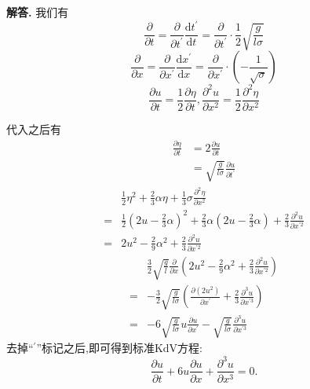 \documentclass[12pt, a4paper, oneside]{ctexart}
\newenvironment{solution}{\par\noindent\textbf{解答. }}{\\\par}
\begin{document}
\begin{solution}
    我们有
    $$
        \frac{\partial }{\partial t}=\frac{\partial }{\partial t^{\prime} }\frac{\mathrm{d}t^{\prime} }{\mathrm{d}t}=\frac{\partial }{\partial t^{\prime} }\cdot\frac{1}{2}\sqrt{\frac{g}{l\sigma}}
    $$
    $$
        \frac{\partial }{\partial x}=\frac{\partial }{\partial x^{\prime} }\frac{\mathrm{d}x^{\prime} }{\mathrm{d}x}=\frac{\partial }{\partial x^{\prime} }\cdot(-\frac{1}{\sqrt{\sigma}})
    $$
    $$
        \frac{\partial u }{\partial t}=\frac{1}{2}\frac{\partial \eta}{\partial t},\frac{\partial ^{2} u}{\partial x^{2} }=\frac{1}{2}\frac{\partial ^{2} \eta}{\partial x^{2} }
    $$

    代入之后有
    \begin{align*}
        \frac{\partial \eta}{\partial t} & =2\frac{\partial u}{\partial t}                                  \\
                                         & =\sqrt{\frac{g}{l\sigma}}\frac{\partial u}{\partial t^{\prime} }
    \end{align*}
    \begin{align*}
          & \frac{1}{2}\eta^{2} +\frac{2}{3}\alpha\eta+\frac{1}{3}\sigma\frac{\partial ^{2} \eta}{\partial x^{2} }                                   \\
        = & \frac{1}{2}(2u-\frac{2}{3}\alpha)^{2} +\frac{2}{3}\alpha(2u-\frac{2}{3}\alpha)+\frac{2}{3}\frac{\partial ^{2} u}{\partial x^{\prime 2} } \\
        = & 2u^{2} -\frac{2}{9}\alpha^{2} +\frac{2}{3}\frac{\partial ^{2} u}{\partial x^{\prime 2} }
    \end{align*}
    \begin{align*}
          & \frac{3}{2}\sqrt{\frac{g}{l}}\frac{\partial }{\partial x}(2u^{2} -\frac{2}{9}\alpha^{2} +\frac{2}{3}\frac{\partial ^{2} u}{\partial x^{\prime 2} }) \\
        = & -\frac{3}{2}\sqrt{\frac{g}{l\sigma}}(\frac{\partial (2u^{2} )}{\partial x^{\prime} }+\frac{2}{3}\frac{\partial ^{3} u}{\partial x^{\prime 3} })     \\
        = & -6\sqrt{\frac{g}{l\sigma}}u\frac{\partial u}{\partial x^{\prime} }-\sqrt{\frac{g}{l\sigma}}\frac{\partial ^{3} u}{\partial x^{\prime 3} }
    \end{align*}
    去掉“$ ^{\prime} $”标记之后,即可得到标准KdV方程:
    $$
        \frac{\partial u}{\partial t}+6u\frac{\partial u}{\partial x}+\frac{\partial ^{3} u}{\partial x^{3} }=0.
    $$
\end{solution}
\end{document}
